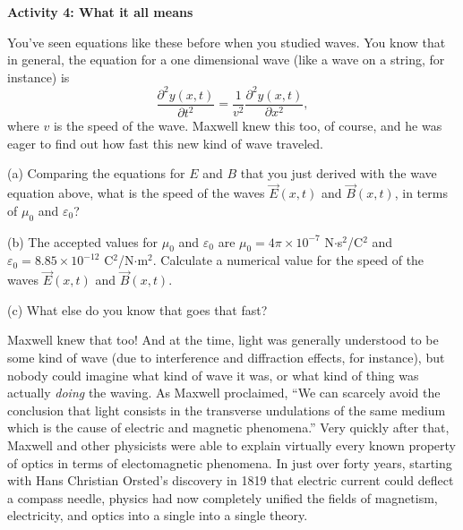 \textbf{Activity 4: What it all means}

You've seen equations like these before when you studied waves.  You know that in general, the equation for a one dimensional wave (like a wave on a string, for instance) is
\begin{displaymath}
\frac{\partial^2y(x,t)}{\partial t^2}= \frac{1}{v^2} \frac{\partial^2y(x,t)}{\partial x^2},
\end{displaymath}
where $v$ is the speed of the wave.  Maxwell knew this too, of course, and he was eager to find out how fast this new kind of wave traveled.

(a) Comparing the equations for $E$ and $B$ that you just derived with the wave equation above, what is the speed of the waves $\vec E(x,t)$ and $\vec B(x,t)$, in terms of $\mu_0$ and $\varepsilon_0$?
\vspace{0.5in}

(b)  The accepted values for $\mu_0$ and $\varepsilon_0$ are $\mu_0=4\pi \times 10^{-7}$ N$\cdot$s$^2$/C$^2$ and 
$\varepsilon_0=8.85 \times 10^{-12}$ C$^2$/N$\cdot $m$^2$.  Calculate a numerical value for the speed of the waves 
$\vec E(x,t)$ and $\vec B(x,t)$.
\vspace{0.5in}

(c) What else do you know that goes that fast?
\vspace{0.5in}

Maxwell knew that too!  And at the time, light was generally understood to be some kind of wave (due to interference and diffraction effects, for instance), but nobody could imagine what kind of wave it was, or what kind of thing was actually \textit{doing} the waving.  As Maxwell proclaimed, ``We can scarcely avoid the conclusion that light consists in the transverse undulations of the same medium which is the cause of electric and magnetic phenomena.''  Very quickly after that, Maxwell and other physicists were able to explain virtually every known property of optics in terms of electomagnetic phenomena.  In just over forty years, starting with  Hans Christian \/Orsted's discovery in 1819 that electric current could deflect a compass needle, physics had now completely unified the fields of magnetism, electricity, and optics into a single into a single theory.  





